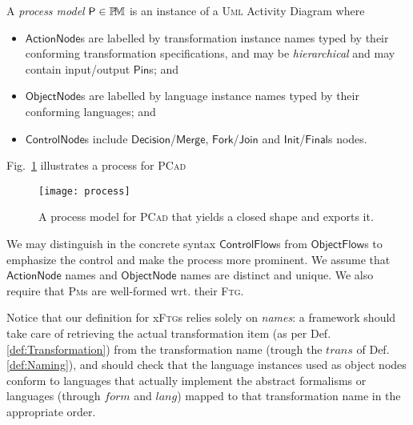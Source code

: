 
\begin{Definition}
A \emph{process model} $\mathsf{P}\in\mathbb{P}\!\mathbb{M}$ is an instance of a \textsc{Uml}
Activity Diagram where
\begin{itemize}
   \item $\mathsf{ActionNode}$s are labelled by transformation instance names 
typed by their conforming transformation specifications, and may be 
\emph{hierarchical} and may contain input/output $\mathsf{Pin}$s; and 
   \item $\mathsf{ObjectNode}$s are labelled by language instance names typed 
by their conforming languages; and 
   \item $\mathsf{ControlNode}$s include 
$\mathsf{Decision}$/$\mathsf{Merge}$, $\mathsf{Fork}$/$\mathsf{Join}$ and 
$\mathsf{Init}$/$\mathsf{Final}$s nodes.   
\end{itemize}
\end{Definition}
\begin{newdef}
Fig.~\ref{fig:Process} illustrates a process for \textsc{PCad} 
\begin{figure}[t]
   \centering
   \texttt{[image: process]}
   \vspace{-1em}
   \caption{A process model for \textsc{PCad} that yields a closed shape and exports it.}%
   \label{fig:Process}%
\end{figure}
\end{newdef}
We may distinguish in the concrete syntax $\mathsf{ControlFlow}$s from 
$\mathsf{ObjectFlow}$s to emphasize the control and make the process more 
prominent. 
We assume that $\mathsf{ActionNode}$ names and $\mathsf{ObjectNode}$ names 
are distinct and unique. We also require that \textsc{Pm}s are well-formed 
wrt. their \textsc{Ftg}.

Notice that our definition for x\textsc{Ftg}s relies solely on \emph{names}: a 
framework should take care of retrieving the actual transformation item (as per 
Def. \ref{def:Transformation}) from the transformation name (trough 
the $trans$ of Def. \ref{def:Naming}), and should check that the language 
instances used as object nodes conform to languages that actually implement the 
abstract formalisms or languages (through $form$ and $lang$) mapped to that 
transformation name in the appropriate 
order.

